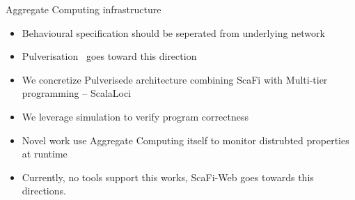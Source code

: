 \begin{frame}{Aggregate Computing infrastructure}
  \begin{card}[Deployment]
    \begin{itemize}
      \item Behavioural specification should be seperated from underlying network
      \item Pulverisation~\cite{scafiloci} goes toward this direction
      \item We concretize Pulverisede architecture combining ScaFi with Multi-tier programming -- ScalaLoci
    \end{itemize}
  \end{card}

  \begin{card}
    \begin{itemize}
      \item We leverage simulation to verify program correctness
      \item Novel work \cite{} use Aggregate Computing itself to monitor distrubted properties at runtime
      \item Currently, no tools support this works, ScaFi-Web goes towards this directions.
    \end{itemize}
  \end{card}
\end{frame}